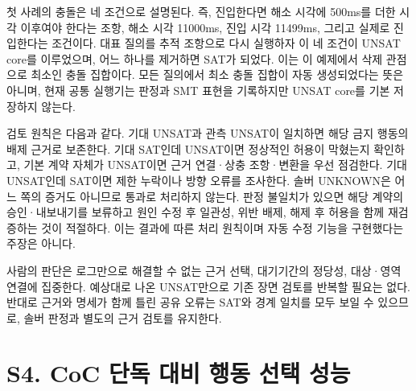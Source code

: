 \documentclass[11pt,a4paper]{article}
\begin{document}
첫 사례의 충돌은 네 조건으로 설명된다. 즉, 진입한다면 해소 시각에 500ms를 더한 시각 이후여야 한다는 조항, 해소 시각 11000ms, 진입 시각 11499ms, 그리고 실제로 진입한다는 조건이다. 대표 질의를 추적 조항으로 다시 실행하자 이 네 조건이 UNSAT core를 이루었으며, 어느 하나를 제거하면 SAT가 되었다. 이는 이 예제에서 삭제 관점으로 최소인 충돌 집합이다. 모든 질의에서 최소 충돌 집합이 자동 생성되었다는 뜻은 아니며, 현재 공통 실행기는 판정과 SMT 표현을 기록하지만 UNSAT core를 기본 저장하지 않는다.\par

검토 원칙은 다음과 같다. 기대 UNSAT과 관측 UNSAT이 일치하면 해당 금지 행동의 배제 근거로 보존한다. 기대 SAT인데 UNSAT이면 정상적인 허용이 막혔는지 확인하고, 기본 계약 자체가 UNSAT이면 근거 연결·상충 조항·변환을 우선 점검한다. 기대 UNSAT인데 SAT이면 제한 누락이나 방향 오류를 조사한다. 솔버 UNKNOWN은 어느 쪽의 증거도 아니므로 통과로 처리하지 않는다. 판정 불일치가 있으면 해당 계약의 승인·내보내기를 보류하고 원인 수정 후 일관성, 위반 배제, 해제 후 허용을 함께 재검증하는 것이 적절하다. 이는 결과에 따른 처리 원칙이며 자동 수정 기능을 구현했다는 주장은 아니다.\par

사람의 판단은 로그만으로 해결할 수 없는 근거 선택, 대기기간의 정당성, 대상·영역 연결에 집중한다. 예상대로 나온 UNSAT만으로 기존 장면 검토를 반복할 필요는 없다. 반대로 근거와 명세가 함께 틀린 공유 오류는 SAT와 경계 일치를 모두 보일 수 있으므로, 솔버 판정과 별도의 근거 검토를 유지한다.\par

\section*{S4. CoC 단독 대비 행동 선택 성능}
\end{document}
